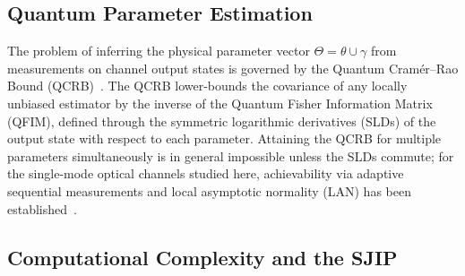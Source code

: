 \documentclass[journal,twocolumn]{IEEEtran}
\theoremstyle{definition}
\theoremstyle{plain}
\begin{document}
\subsection{Quantum Parameter Estimation}
The problem of inferring the physical parameter vector
$\Theta = \theta \cup \gamma$ from measurements on channel output
states is governed by the Quantum Cram\'{e}r--Rao Bound
(QCRB)~\cite{helstrom1976,holevo2011,paris2009}.  The QCRB
lower-bounds the covariance of any locally unbiased estimator by the
inverse of the Quantum Fisher Information Matrix (QFIM), defined
through the symmetric logarithmic derivatives (SLDs) of the output
state with respect to each parameter.  Attaining the QCRB for
multiple parameters simultaneously is in general impossible unless
the SLDs commute; for the single-mode optical channels studied here,
achievability via adaptive sequential measurements and local
asymptotic normality (LAN) has been established~\cite{giovannetti2011,kahnguta2009}.

\subsection{Computational Complexity and the SJIP}
\end{document}
